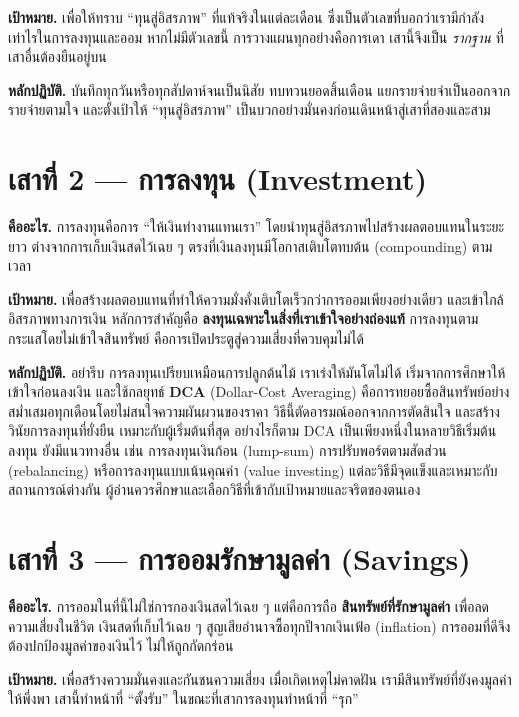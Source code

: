 \documentclass[14pt,a4paper,twocolumn]{extarticle}
\begin{document}
\textbf{เป้าหมาย.} เพื่อให้ทราบ “ทุนสู่อิสรภาพ” ที่แท้จริงในแต่ละเดือน ซึ่งเป็นตัวเลขที่บอกว่าเรามีกำลังเท่าไรในการลงทุนและออม หากไม่มีตัวเลขนี้ การวางแผนทุกอย่างคือการเดา เสานี้จึงเป็น \textit{รากฐาน} ที่เสาอื่นต้องยืนอยู่บน

\textbf{หลักปฏิบัติ.} บันทึกทุกวันหรือทุกสัปดาห์จนเป็นนิสัย ทบทวนยอดสิ้นเดือน แยกรายจ่ายจำเป็นออกจากรายจ่ายตามใจ และตั้งเป้าให้ “ทุนสู่อิสรภาพ” เป็นบวกอย่างมั่นคงก่อนเดินหน้าสู่เสาที่สองและสาม

\section{เสาที่ 2 — การลงทุน (Investment)}
\textbf{คืออะไร.} การลงทุนคือการ “ให้เงินทำงานแทนเรา” โดยนำทุนสู่อิสรภาพไปสร้างผลตอบแทนในระยะยาว ต่างจากการเก็บเงินสดไว้เฉย ๆ ตรงที่เงินลงทุนมีโอกาสเติบโตทบต้น (compounding) ตามเวลา

\textbf{เป้าหมาย.} เพื่อสร้างผลตอบแทนที่ทำให้ความมั่งคั่งเติบโตเร็วกว่าการออมเพียงอย่างเดียว และเข้าใกล้อิสรภาพทางการเงิน หลักการสำคัญคือ \textbf{ลงทุนเฉพาะในสิ่งที่เราเข้าใจอย่างถ่องแท้} การลงทุนตามกระแสโดยไม่เข้าใจสินทรัพย์ คือการเปิดประตูสู่ความเสี่ยงที่ควบคุมไม่ได้

\textbf{หลักปฏิบัติ.} อย่ารีบ การลงทุนเปรียบเหมือนการปลูกต้นไม้ เราเร่งให้มันโตไม่ได้ เริ่มจากการศึกษาให้เข้าใจก่อนลงเงิน และใช้กลยุทธ์ \textbf{DCA} (Dollar-Cost Averaging) คือการทยอยซื้อสินทรัพย์อย่างสม่ำเสมอทุกเดือนโดยไม่สนใจความผันผวนของราคา วิธีนี้ตัดอารมณ์ออกจากการตัดสินใจ และสร้างวินัยการลงทุนที่ยั่งยืน เหมาะกับผู้เริ่มต้นที่สุด อย่างไรก็ตาม DCA เป็นเพียงหนึ่งในหลายวิธีเริ่มต้นลงทุน ยังมีแนวทางอื่น เช่น การลงทุนเงินก้อน (lump-sum) การปรับพอร์ตตามสัดส่วน (rebalancing) หรือการลงทุนแบบเน้นคุณค่า (value investing) แต่ละวิธีมีจุดแข็งและเหมาะกับสถานการณ์ต่างกัน ผู้อ่านควรศึกษาและเลือกวิธีที่เข้ากับเป้าหมายและจริตของตนเอง

\section{เสาที่ 3 — การออมรักษามูลค่า (Savings)}
\textbf{คืออะไร.} การออมในที่นี้ไม่ใช่การกองเงินสดไว้เฉย ๆ แต่คือการถือ \textbf{สินทรัพย์ที่รักษามูลค่า} เพื่อลดความเสี่ยงในชีวิต เงินสดที่เก็บไว้เฉย ๆ สูญเสียอำนาจซื้อทุกปีจากเงินเฟ้อ (inflation) การออมที่ดีจึงต้องปกป้องมูลค่าของเงินไว้ ไม่ให้ถูกกัดกร่อน

\textbf{เป้าหมาย.} เพื่อสร้างความมั่นคงและกันชนความเสี่ยง เมื่อเกิดเหตุไม่คาดฝัน เรามีสินทรัพย์ที่ยังคงมูลค่าให้พึ่งพา เสานี้ทำหน้าที่ “ตั้งรับ” ในขณะที่เสาการลงทุนทำหน้าที่ “รุก”
\end{document}
